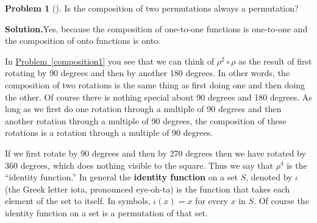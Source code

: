 \documentclass[10pt,]{book}
\newcommand{\terminology}[1]{\textbf{#1}}
\theoremstyle{plain}
\theoremstyle{definition}
\newtheorem{activity}[project]{Problem}
\theoremstyle{definition}
\numberwithin{equation}{chapter}
\begin{document}
\begin{activity}[]\label{activity-249}
Is the composition of two permutations always a permutation?%
\par\medskip\noindent%
\textbf{Solution.}\quad Yes, because the composition of one-to-one functions is one-to-one and the composition of onto functions is onto.%
\end{activity}
In \hyperref[composition1]{Problem~\ref{composition1}} you see that we can think of \(\rho^2\circ\rho\) as the result of first rotating by 90 degrees and then by another 180 degrees. In other words, the composition of two rotations is the same thing as first doing one and then doing the other. Of course there is nothing special about 90 degrees and 180 degrees.  As long as we first do one rotation through a multiple of 90 degrees and then another rotation through a multiple of 90 degrees, the composition of these rotations is a rotation through a multiple of 90 degrees.%
\par
If we first rotate by 90 degrees and then by 270 degrees then we have rotated by 360 degrees, which does nothing visible to the square. Thus we say that \(\rho^4\) is the ``identity function.'' In general the \terminology{identity function} on a set \(S\), denoted by \(\iota\) (the Greek letter iota, pronounced eye-oh-ta) is the function that takes each element of the set to itself. In symbols, \(\iota(x) =x\) for every \(x\) in \(S\). Of course the identity function on a set is a permutation of that set.%
\typeout{************************************************}
\typeout{************************************************}
\end{document}
